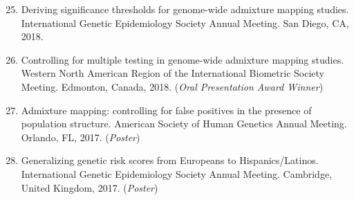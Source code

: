 \documentclass[margin]{res}
\newenvironment{benumerate}[1]{
    \let\oldItem\item
    \def\item{\addtocounter{enumi}{-2}\oldItem}
    
    \begin{enumerate}
    \setcounter{enumi}{#1}
    \addtocounter{enumi}{1}
}{
    \end{enumerate}
}
\begin{document}
\begin{resume}
\begin{benumerate}{24}
\item %
Deriving significance thresholds for genome-wide admixture mapping studies. International Genetic Epidemiology Society Annual Meeting. San Diego, CA, 2018. 


\item %
Controlling for multiple testing in genome-wide admixture mapping studies. Western North American Region of the International Biometric Society Meeting. Edmonton, Canada, 2018. (\textit{Oral Presentation Award Winner})



\item %
Admixture mapping: controlling for false positives in the presence of population structure. American Society of Human Genetics Annual Meeting. Orlando, FL, 2017. (\textit{Poster})

\item %
Generalizing genetic risk scores from Europeans to Hispanics/Latinos. International Genetic Epidemiology Society Annual Meeting. Cambridge, United Kingdom, 2017. (\textit{Poster})





\end{benumerate}
\end{resume}
\end{document}
